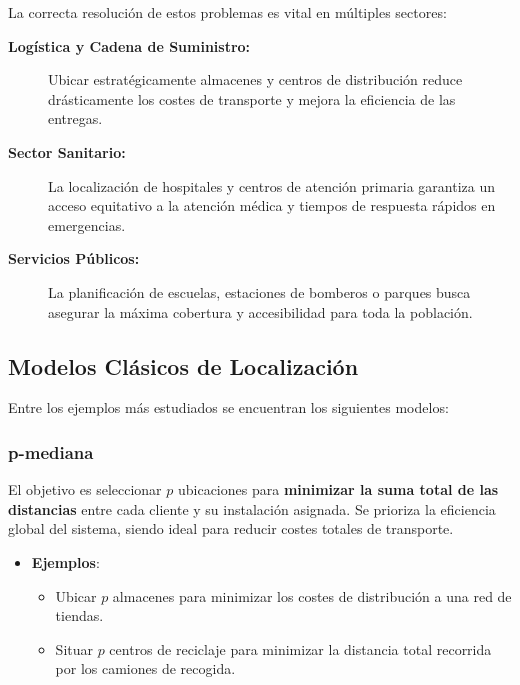 \documentclass[12pt,a4paper]{book}
\begin{document}
La correcta resolución de estos problemas es vital en múltiples sectores:
\begin{description}
    \item[\textbf{Logística y Cadena de Suministro:}] Ubicar estratégicamente almacenes y centros de distribución reduce drásticamente los costes de transporte y mejora la eficiencia de las entregas.
    \item[\textbf{Sector Sanitario:}] La localización de hospitales y centros de atención primaria garantiza un acceso equitativo a la atención médica y tiempos de respuesta rápidos en emergencias.
    \item[\textbf{Servicios Públicos:}] La planificación de escuelas, estaciones de bomberos o parques busca asegurar la máxima cobertura y accesibilidad para toda la población.
\end{description}

\hrulefill

\subsection{Modelos Clásicos de Localización}

Entre los ejemplos más estudiados se encuentran los siguientes modelos:

\subsubsection{p-mediana}
El objetivo es seleccionar $p$ ubicaciones para \textbf{minimizar la suma total de las distancias} entre cada cliente y su instalación asignada. Se prioriza la eficiencia global del sistema, siendo ideal para reducir costes totales de transporte.
\begin{itemize}
    \item \textbf{Ejemplos}:
    \begin{itemize}
        \item Ubicar $p$ almacenes para minimizar los costes de distribución a una red de tiendas.
        \item Situar $p$ centros de reciclaje para minimizar la distancia total recorrida por los camiones de recogida.
    \end{itemize}
\end{itemize}
\end{document}
